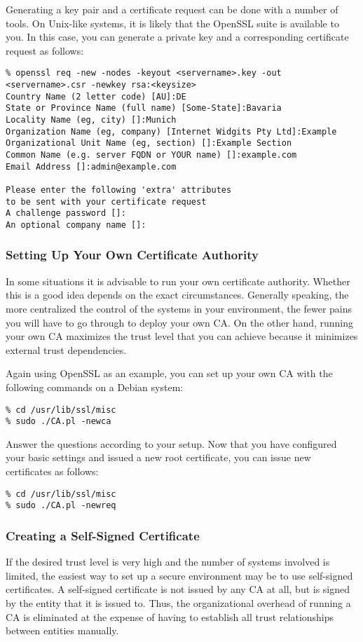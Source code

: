 Generating a key pair and a certificate request can be done with a number of
tools.  On Unix-like systems, it is likely that the OpenSSL suite is available
to you.  In this case, you can generate a private key and a corresponding
certificate request as follows:

\begin{lstlisting}
% openssl req -new -nodes -keyout <servername>.key -out <servername>.csr -newkey rsa:<keysize>
Country Name (2 letter code) [AU]:DE
State or Province Name (full name) [Some-State]:Bavaria
Locality Name (eg, city) []:Munich
Organization Name (eg, company) [Internet Widgits Pty Ltd]:Example
Organizational Unit Name (eg, section) []:Example Section
Common Name (e.g. server FQDN or YOUR name) []:example.com
Email Address []:admin@example.com

Please enter the following 'extra' attributes
to be sent with your certificate request
A challenge password []:
An optional company name []:
\end{lstlisting}

\subsubsection{Setting Up Your Own Certificate Authority}
\label{sec:setupownca}
In some situations it is advisable to run your own certificate authority.
Whether this is a good idea depends on the exact circumstances.  Generally
speaking, the more centralized the control of the systems in your
environment, the fewer pains you will have to go through to deploy your own
CA.  On the other hand, running your own CA maximizes the trust level that
you can achieve because it minimizes external trust dependencies.

Again using OpenSSL as an example, you can set up your own CA with the
following commands on a Debian system:

\begin{lstlisting}
% cd /usr/lib/ssl/misc
% sudo ./CA.pl -newca
\end{lstlisting}

Answer the questions according to your setup. Now that you have configured your basic settings and 
issued a new root certificate, you can issue new certificates as follows:

\begin{lstlisting}
% cd /usr/lib/ssl/misc
% sudo ./CA.pl -newreq
\end{lstlisting}

\subsubsection{Creating a Self-Signed Certificate}
\label{sec:pki:selfsignedcert}
If the desired trust level is very high and the number of systems involved
is limited, the easiest way to set up a secure environment may be to use
self-signed certificates.  A self-signed certificate is not issued by any
CA at all, but is signed by the entity that it is issued to.  Thus, the
organizational overhead of running a CA is eliminated at the expense of
having to establish all trust relationships between entities manually.


